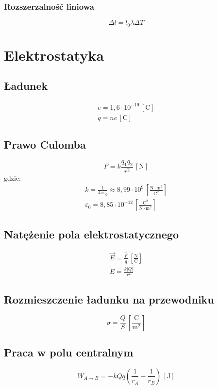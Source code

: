 \documentclass{report}
\numberwithin{equation}{chapter}
\newcommand{\unit}[1]{\,\left[\mathrm{#1}\right]}
\begin{document}
      \subsection{Rozszerzalność liniowa}
        \begin{equation}
          \Delta l = l_0\lambda\Delta T
        \end{equation}

  \newpage
  \chapter{Elektrostatyka}
    \section{Ładunek}
      \begin{gather}
        e = 1,6\cdot 10^{-19} \unit{C}\\
        q = ne \unit{C}
      \end{gather}
    \section{Prawo Culomba}
      \begin{equation}
        F = k\frac{q_1q_2}{r^2} \unit{N}
      \end{equation}
      gdzie:
      \begin{gather}
        k = \frac{1}{4\pi\varepsilon_0} \approx 8,99\cdot 10^9 \unit{\frac{N\cdot m^2}{C^2}}\\
        \varepsilon_0 = 8,85\cdot 10^{-12} \unit{\frac{C^2}{N\cdot m^2}}
      \end{gather}
    \section{Natężenie pola elektrostatycznego}
      \begin{gather}
        \vec E = \frac{\vec F}{q} \unit{\frac{N}{C}}\\
        E = \frac{k|Q|}{r^2}
      \end{gather}
    \section{Rozmieszczenie ładunku na przewodniku}
      \begin{equation}
        \sigma = \frac{Q}{S} \unit{\frac{C}{m^2}}
      \end{equation}
    \section{Praca w polu centralnym}
      \begin{equation}
        W_{A\rightarrow B} = -kQq\left(\frac{1}{r_A} - \frac{1}{r_B}\right) \unit{J}
      \end{equation}
\end{document}
